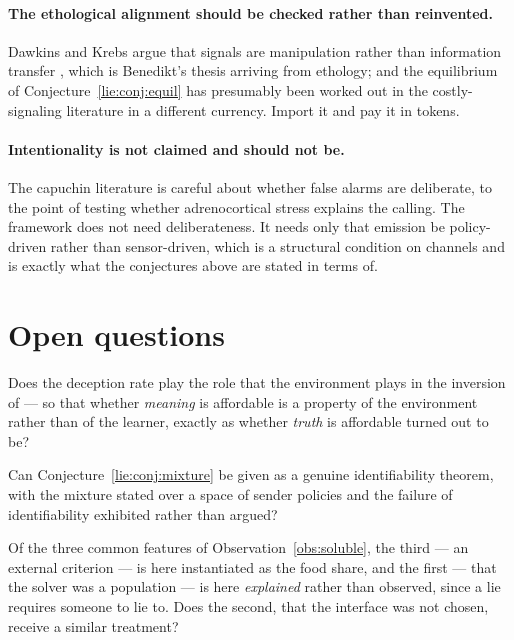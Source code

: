 \paragraph{The ethological alignment should be checked rather than reinvented.}
Dawkins and Krebs argue that signals are manipulation rather than information
transfer \cite{dawkinskrebs1978}, which is Benedikt's thesis arriving from
ethology; and the equilibrium of Conjecture~\ref{lie:conj:equil} has presumably
been worked out in the costly-signaling literature \cite{msharper2003} in a
different currency. Import it and pay it in tokens.

\paragraph{Intentionality is not claimed and should not be.} The capuchin
literature is careful about whether false alarms are deliberate, to the point of
testing whether adrenocortical stress explains the calling. The framework does
not need deliberateness. It needs only that emission be policy-driven rather than
sensor-driven, which is a structural condition on channels and is exactly what
the conjectures above are stated in terms of.

\section{Open questions}
\label{sec:lie-open}

\begin{question}
Does the deception rate play the role that the environment plays in the
inversion of \chComp --- so that whether \emph{meaning} is affordable is a
property of the environment rather than of the learner, exactly as whether
\emph{truth} is affordable turned out to be?
\end{question}

\begin{question}
Can Conjecture~\ref{lie:conj:mixture} be given as a genuine identifiability
theorem, with the mixture stated over a space of sender policies and the failure
of identifiability exhibited rather than argued?
\end{question}

\begin{question}
Of the three common features of Observation~\ref{obs:soluble}, the third --- an
external criterion --- is here instantiated as the food share, and the first ---
that the solver was a population --- is here \emph{explained} rather than
observed, since a lie requires someone to lie to. Does the second, that the
interface was not chosen, receive a similar treatment?
\end{question}

